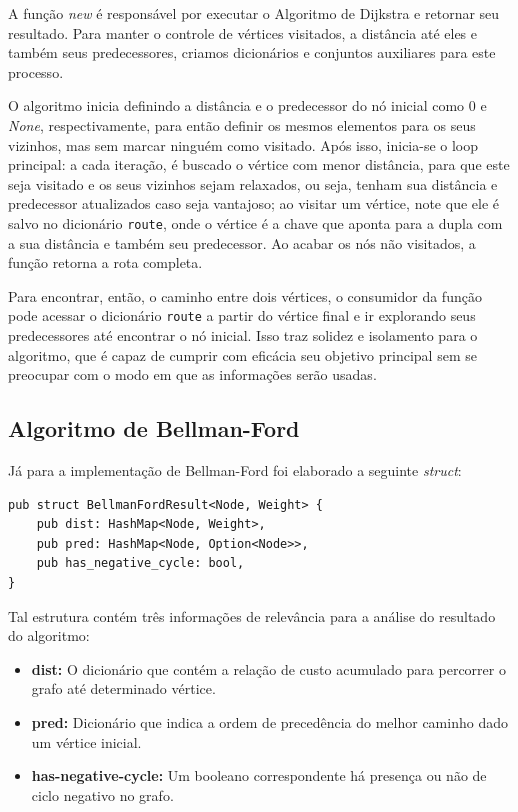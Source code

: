 A função \textit{new} é responsável por executar o Algoritmo de
Dijkstra e retornar seu resultado. Para manter o controle de vértices
visitados, a distância até eles e também seus predecessores, criamos
dicionários e conjuntos auxiliares para este processo.

O algoritmo inicia definindo a distância e o predecessor do nó
inicial como 0 e \textit{None}, respectivamente, para então definir
os mesmos elementos para os seus vizinhos, mas sem marcar ninguém
como visitado. Após isso, inicia-se o loop principal: a cada
iteração, é buscado o vértice com menor distância, para que este seja
visitado e os seus vizinhos sejam relaxados, ou seja, tenham sua
distância e predecessor atualizados caso seja vantajoso; ao visitar
um vértice, note que ele é salvo no dicionário \texttt{route}, onde o
vértice é a chave que aponta para a dupla com a sua distância e
também seu predecessor. Ao acabar os nós não visitados, a função
retorna a rota completa.

Para encontrar, então, o caminho entre dois vértices, o consumidor da
função pode acessar o dicionário \texttt{route} a partir do vértice
final e ir explorando seus predecessores até encontrar o nó inicial.
Isso traz solidez e isolamento para o algoritmo, que é capaz de
cumprir com eficácia seu objetivo principal sem se preocupar com o
modo em que as informações serão usadas.

\subsection{Algoritmo de Bellman-Ford}
Já para a implementação de Bellman-Ford foi elaborado a seguinte
\textit{struct}:

\begin{listing}[H]
  \caption{Estrutura que encapsula o resultado do Algoritmo de Bellman-Ford}
\begin{verbatim}
pub struct BellmanFordResult<Node, Weight> {
    pub dist: HashMap<Node, Weight>,
    pub pred: HashMap<Node, Option<Node>>,
    pub has_negative_cycle: bool,
}
\end{verbatim}
\end{listing}

Tal estrutura contém três informações de relevância para a análise do
resultado do algoritmo:

\begin{itemize}
  \item \textbf{dist:} O dicionário que contém a relação de custo
    acumulado para percorrer o grafo até determinado vértice.
  \item \textbf{pred:} Dicionário que indica a ordem de precedência
    do melhor caminho dado um vértice inicial.
  \item \textbf{has-negative-cycle:} Um booleano correspondente há
    presença ou não de ciclo negativo no grafo.
\end{itemize}

